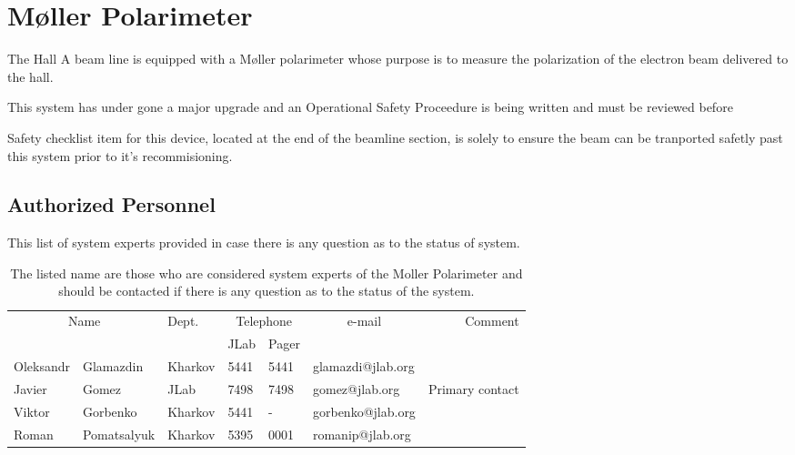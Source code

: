 \chapter[M{\o}ller Polarimeter]{M{\o}ller Polarimeter}

The Hall A beam line is equipped with a M{\o}ller 
polarimeter
whose purpose is 
to measure the polarization of the electron beam delivered to the hall. 

This system has under gone a major upgrade and an Operational Safety Proceedure
is being written and must be reviewed before

Safety checklist item for this device, located at the end of the beamline section, is solely to ensure
the beam can be tranported safetly past this system prior to it's recommisioning.

\section[Authorized  Personnel]{Authorized  Personnel}
\label{sec:moller-pers}

This list of system experts provided in case there is any question as to the status of system.

\begin{table}[ht]
\begin{center}
\begin{tabular}{|ll|l|l|l|l|r|} \hline
  \multicolumn{2}{|c|}{Name} & Dept. & \multicolumn{2}{c|}{Telephone} & 
  \multicolumn{1}{c|}{e-mail} & Comment \\ 
  \cline{4-5}
   &  &   & JLab & Pager &  & \\ 
\hline
 Oleksandr    & Glamazdin       & Kharkov & 5441 & 5441 & glamazdi@jlab.org &  \\ 
 Javier       & Gomez           & JLab    & 7498 & 7498 & gomez@jlab.org    & Primary contact     \\ 
 Viktor       & Gorbenko        & Kharkov & 5441 &   -  & gorbenko@jlab.org &  \\ 
 Roman        & Pomatsalyuk     & Kharkov & 5395 & 0001 & romanip@jlab.org  &  \\ 
\hline
\end{tabular}
\end{center}
\caption[Moller Polarimeter: authorized personnel]{
   The listed name are those who are considered system experts of the Moller Polarimeter and should be contacted
   if there is any question as to the status of the system.
}
\label{tab:moller:personnel}
\end{table}

